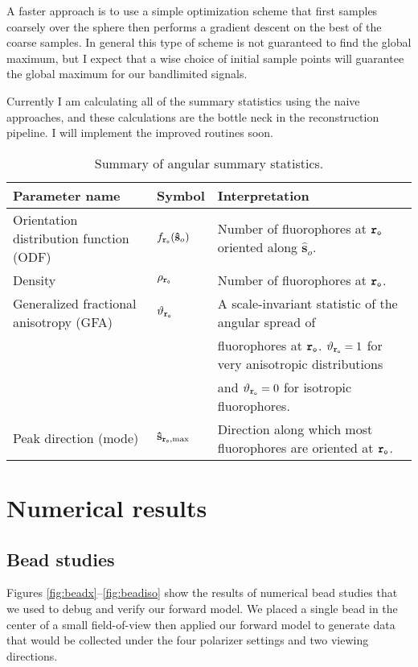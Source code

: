 \documentclass[11pt]{article}
\providecommand{\so}{\mathbf{\hat{s}}_o}
\providecommand{\tb}[1]{\textbf{#1}}
\providecommand{\ttt}[1]{\texttt{#1}}
\begin{document}
A faster approach is to use a simple optimization scheme that first samples
coarsely over the sphere then performs a gradient descent on the best of the
coarse samples. In general this type of scheme is not guaranteed to find the
global maximum, but I expect that a wise choice of initial sample points will
guarantee the global maximum for our bandlimited signals.

Currently I am calculating all of the summary statistics using the naive
approaches, and these calculations are the bottle neck in the reconstruction
pipeline. I will implement the improved routines soon.

\begin{table}[h]
\centering
\begin{tabular}{lll}\toprule
  Parameter name & Symbol & Interpretation\\
  \midrule
  Orientation distribution function (ODF) & $f_{\ttt{\tb{r}}_{\ttt{o}}}(\so)$ & Number of fluorophores at $\ttt{\tb{r}}_{\ttt{o}}$ oriented along $\so$.\\
  Density & $\rho_{\ttt{\tb{r}}_{\ttt{o}}}$ & Number of fluorophores at $\ttt{\tb{r}}_{\ttt{o}}$. \\
  Generalized fractional anisotropy (GFA) & $\vartheta_{\ttt{\tb{r}}_{\ttt{o}}}$ & A scale-invariant statistic of the angular spread of\\
                 & & fluorophores at $\ttt{\tb{r}}_{\ttt{o}}$. $\vartheta_{\ttt{\tb{r}}_{\ttt{o}}} = 1$ for very anisotropic distributions\\
                 & & and $\vartheta_{\ttt{\tb{r}}_{\ttt{o}}} = 0$ for isotropic fluorophores.  \\
  Peak direction (mode) & $\mathbf{\hat{s}}_{\ttt{\tb{r}}_{\ttt{o}}, \text{max}}$ & Direction along which most fluorophores are oriented at $\ttt{\tb{r}}_{\ttt{o}}$. \\
  
  \bottomrule
\end{tabular}
\caption{Summary of angular summary statistics.}
\end{table}

\section{Numerical results} \label{sec:num}
\subsection{Bead studies}
Figures \ref{fig:beadx}--\ref{fig:beadiso} show the results of numerical bead
studies that we used to debug and verify our forward model. We placed a single
bead in the center of a small field-of-view then applied our forward model to
generate data that would be collected under the four polarizer settings and two
viewing directions.
\end{document}
